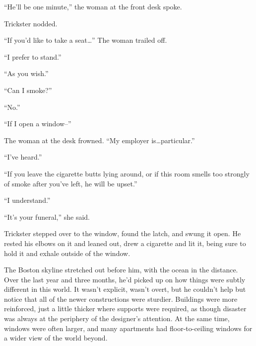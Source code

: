 





``He'll be one minute,'' the woman at the front desk spoke.



Trickster nodded.



``If you'd like to take a seat\ldots''  The woman trailed off.



``I prefer to stand.''



``As you wish.''



``Can I smoke?''



``No.''



``If I open a window--''



The woman at the desk frowned.  ``My employer is\ldots particular.''



``I've heard.''



``If you leave the cigarette butts lying around, or if this room smells too strongly of smoke after you've left, he will be upset.''



``I understand.''



``It's your funeral,'' she said.



Trickster stepped over to the window, found the latch, and swung it open.  He rested his elbows on it and leaned out, drew a cigarette and lit it, being sure to hold it and exhale outside of the window.



The Boston skyline stretched out before him, with the ocean in the distance.  Over the last year and three months, he'd picked up on how things were subtly different in this world.  It wasn't explicit, wasn't overt, but he couldn't help but notice that all of the newer constructions were sturdier.  Buildings were more reinforced, just a little thicker where supports were required, as though disaster was always at the periphery of the designer's attention.  At the same time, windows were often larger, and many apartments had floor-to-ceiling windows for a wider view of the world beyond.



